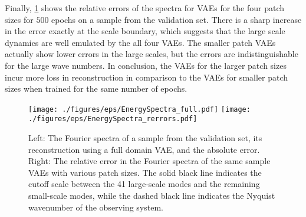 \documentclass[final,3p]{elsarticle}
\theoremstyle{break}
\begin{document}
Finally, \cref{fig:spectra} shows the relative errors of the spectra for VAEs for the four patch sizes for $500$ epochs on a sample from the validation set.
There is a sharp increase in the error exactly at the scale boundary, which suggests that the large scale dynamics are well emulated by the all four VAEs. The smaller patch VAEs actually show lower errors in the large scales, but the errors are indistinguishable for the large wave numbers. 
In conclusion, the VAEs for the larger patch sizes incur more loss in reconstruction in comparison to the VAEs for smaller patch sizes when trained for the same number of epochs.
\begin{figure}[h]
	\centering
	\texttt{[image: ./figures/eps/EnergySpectra\_full.pdf]}
	\texttt{[image: ./figures/eps/EnergySpectra\_rerrors.pdf]}
	\caption{\label{fig:spectra} Left: The Fourier spectra of a sample from the validation set, its reconstruction using a full domain VAE, and the absolute error. Right: The relative error in the Fourier spectra of the same sample VAEs with various patch sizes. The solid black line indicates the cutoff scale between the 41 large-scale modes and the remaining small-scale modes, while the dashed black line indicates the Nyquist wavenumber of the observing system.}
\end{figure}
\end{document}
